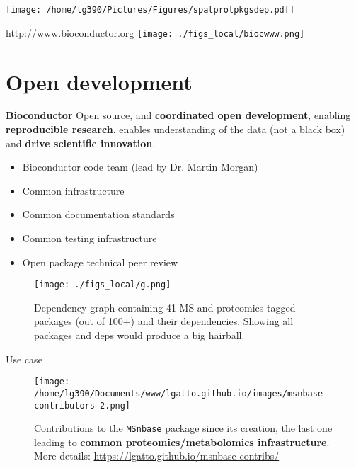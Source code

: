\begin{frame}
\texttt{[image: /home/lg390/Pictures/Figures/spatprotpkgsdep.pdf]}
\end{frame}


\begin{frame}{\url{http://www.bioconductor.org}}
\texttt{[image: ./figs\_local/biocwww.png]}
\end{frame}

\section{Open development}


\begin{frame}{}
  \href{http://bioconductor.org/}{\textbf{Bioconductor}} Open source,
  and \textbf{coordinated open development}, enabling
  \textbf{reproducible research}, enables understanding of the data
  (not a black box) and \textbf{drive scientific innovation}.
  \begin{itemize}
  \item Bioconductor code team (lead by Dr. Martin Morgan)
  \item Common infrastructure
  \item Common documentation standards
  \item Common testing infrastructure
  \item Open package technical peer review
  \end{itemize}
\end{frame}

\begin{frame}
  \begin{figure}[h]
    \centering
    \texttt{[image: ./figs\_local/g.png]}
    \caption{Dependency graph containing 41 MS and proteomics-tagged
      packages (out of 100+) and their dependencies. Showing all
      packages and deps would produce a big hairball.}
  \end{figure}
\end{frame}

\begin{frame}{Use case}
  \begin{figure}[h]
    \centering
    \texttt{[image: /home/lg390/Documents/www/lgatto.github.io/images/msnbase-contributors-2.png]}
    \caption{Contributions to the \texttt{MSnbase} package since its
      creation, the last one leading to \textbf{common
        proteomics/metabolomics infrastructure}. More details:
      \url{https://lgatto.github.io/msnbase-contribs/}}
    \label{fig:msnbase}
  \end{figure}
  
  
  
\end{frame}